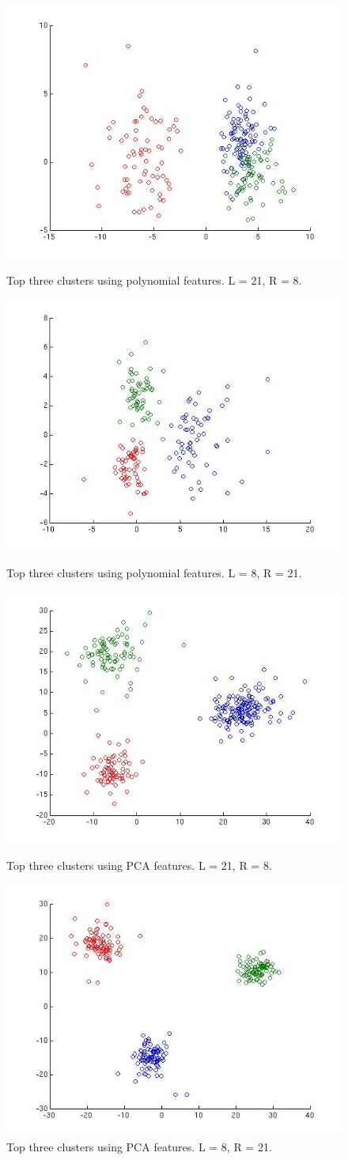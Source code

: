 \documentclass[conference]{IEEEtran}
\begin{document}
\begin{figure}
\centering
\includegraphics[width=0.7\linewidth]{plots/poly_L.jpg}
\caption{Top three clusters using polynomial features. L = 21, R = 8.}
\includegraphics[width=0.7\linewidth]{plots/poly_R.jpg}
\caption{Top three clusters using polynomial features. L = 8, R = 21.}
\includegraphics[width=0.7\linewidth]{plots/PCA_L.jpg}
\caption{Top three clusters using PCA features. L = 21, R = 8.}
\includegraphics[width=0.7\linewidth]{plots/PCA_R.jpg}
\caption{Top three clusters using PCA features. L = 8, R = 21.}
\end{figure}
\end{document}
